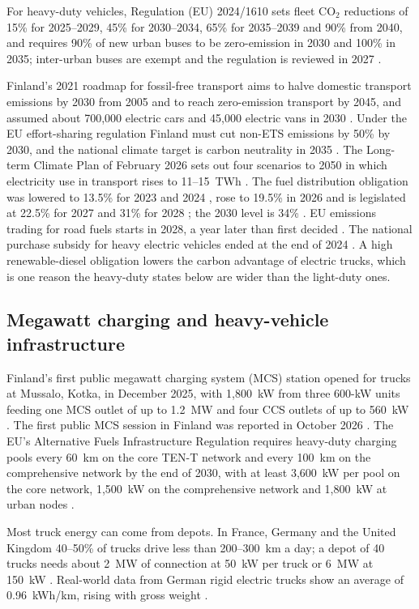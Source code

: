 \documentclass[11pt,a4paper]{article}
\begin{document}
For heavy-duty vehicles, Regulation (EU) 2024/1610 sets fleet CO$_2$ reductions of 15\% for 2025--2029, 45\% for 2030--2034, 65\% for 2035--2039 and 90\% from 2040, and requires 90\% of new urban buses to be zero-emission in 2030 and 100\% in 2035; inter-urban buses are exempt and the regulation is reviewed in 2027 \citep{oeil2024hdv}.

Finland's 2021 roadmap for fossil-free transport aims to halve domestic transport emissions by 2030 from 2005 and to reach zero-emission transport by 2045, and assumed about 700,000 electric cars and 45,000 electric vans in 2030 \citep{vn2021roadmap}. Under the EU effort-sharing regulation Finland must cut non-ETS emissions by 50\% by 2030, and the national climate target is carbon neutrality in 2035 \citep{traficom2025tilli}. The Long-term Climate Plan of February 2026 sets out four scenarios to 2050 in which electricity use in transport rises to 11--15~TWh \citep{meae2026ltcp}. The fuel distribution obligation was lowered to 13.5\% for 2023 and 2024 \citep{energiavirasto2026jakelu}, rose to 19.5\% in 2026 and is legislated at 22.5\% for 2027 and 31\% for 2028 \citep{skal2026}; the 2030 level is 34\% \citep{ieaamf2025finland}. EU emissions trading for road fuels starts in 2028, a year later than first decided \citep{skal2026}. The national purchase subsidy for heavy electric vehicles ended at the end of 2024 \citep{traficom2025tilli}. A high renewable-diesel obligation lowers the carbon advantage of electric trucks, which is one reason the heavy-duty states below are wider than the light-duty ones.

\subsection{Megawatt charging and heavy-vehicle infrastructure}
Finland's first public megawatt charging system (MCS) station opened for trucks at Mussalo, Kotka, in December 2025, with 1,800~kW from three 600-kW units feeding one MCS outlet of up to 1.2~MW and four CCS outlets of up to 560~kW \citep{kempower2026kotka}. The first public MCS session in Finland was reported in October 2026 \citep{electrive2026plugit}. The EU's Alternative Fuels Infrastructure Regulation requires heavy-duty charging pools every 60~km on the core TEN-T network and every 100~km on the comprehensive network by the end of 2030, with at least 3,600~kW per pool on the core network, 1,500~kW on the comprehensive network and 1,800~kW at urban nodes \citep{icct2023afir}.

Most truck energy can come from depots. In France, Germany and the United Kingdom 40--50\% of trucks drive less than 200--300~km a day; a depot of 40 trucks needs about 2~MW of connection at 50~kW per truck or 6~MW at 150~kW \citep{te2025depot}. Real-world data from German rigid electric trucks show an average of 0.96~kWh/km, rising with gross weight \citep{oeko2025elv}.
\end{document}
